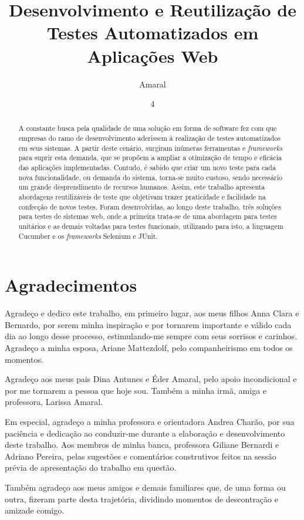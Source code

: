 \documentclass[tg]{mdtufsm}
\title{Desenvolvimento e Reutilização de Testes Automatizados em Aplicações Web}
\author{Amaral}{Lucas Antunes}
\institute{Centro de Tecnologia}
\date{4}{Dezembro}{2015}
\begin{document}
\maketitle
\makeapprove
%

\chapter*{Agradecimentos}
Agradeço e dedico este trabalho, em primeiro lugar, aos meus filhos Anna Clara e Bernardo, por serem minha inspiração e por tornarem importante e válido cada dia ao longo desse processo, estimulando-me sempre com seus sorrisos e carinhos. Agradeço a minha esposa, Ariane Mattezdolf, pelo companheirismo em todos os momentos. 

Agradeço aos meus pais Dina Antunes e Éder Amaral, pelo apoio incondicional e por me tornarem a pessoa que hoje sou. Também a minha irmã, amiga e professora, Larissa Amaral.

Em especial, agradeço a minha professora e orientadora Andrea Charão, por sua paciência e dedicação ao conduzir-me durante a elaboração e desenvolvimento deste trabalho. Aos membros de minha banca, professora Giliane Bernardi e Adriano Pereira, pelas sugestões e comentários construtivos feitos na sessão prévia de apresentação do trabalho em questão.  

Também agradeço aos meus amigos e demais familiares que, de uma forma ou outra, fizeram parte desta trajetória, dividindo momentos de descontração e amizade comigo.
\begin{abstract}
A constante busca pela qualidade de uma solução em forma de software fez com que empresas do ramo de desenvolvimento aderissem à realização de testes automatizados em seus sistemas. A partir deste cenário,
surgiram inúmeras ferramentas e \emph{frameworks} para suprir esta demanda, que se propõem  a ampliar a otimização de tempo e eficácia das aplicações implementadas. Contudo, é sabido que criar um novo teste para cada nova funcionalidade, ou demanda do sistema, torna-se muito custoso, sendo necessário um grande desprendimento de recursos humanos. Assim, este trabalho apresenta abordagens reutilizáveis de teste que objetivam trazer praticidade e facilidade na confecção de novos testes. Foram desenvolvidas, ao longo deste trabalho, três soluções para testes de sistemas web, onde a primeira trata-se de uma abordagem para testes unitários e as demais voltadas para testes funcionais, utilizando para isto, a linguagem Cucumber e os \emph{frameworks} Selenium e JUnit.

\end{abstract}
\end{document}
